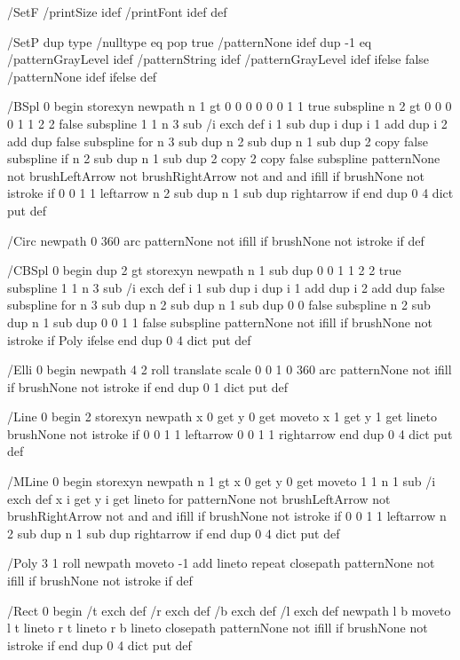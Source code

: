/SetF {
/printSize idef
/printFont idef
} def

/SetP {
dup type /nulltype eq {
pop true /patternNone idef
} {
dup -1 eq {
/patternGrayLevel idef
/patternString idef
} {
/patternGrayLevel idef
} ifelse
false /patternNone idef
} ifelse
} def

/BSpl {
0 begin
storexyn
newpath
n 1 gt {
0 0 0 0 0 0 1 1 true subspline
n 2 gt {
0 0 0 0 1 1 2 2 false subspline
1 1 n 3 sub {
/i exch def
i 1 sub dup i dup i 1 add dup i 2 add dup false subspline
} for
n 3 sub dup n 2 sub dup n 1 sub dup 2 copy false subspline
} if
n 2 sub dup n 1 sub dup 2 copy 2 copy false subspline
patternNone not brushLeftArrow not brushRightArrow not and and { ifill } if
brushNone not { istroke } if
0 0 1 1 leftarrow
n 2 sub dup n 1 sub dup rightarrow
} if
end
} dup 0 4 dict put def

/Circ {
newpath
0 360 arc
patternNone not { ifill } if
brushNone not { istroke } if
} def

/CBSpl {
0 begin
dup 2 gt {
storexyn
newpath
n 1 sub dup 0 0 1 1 2 2 true subspline
1 1 n 3 sub {
/i exch def
i 1 sub dup i dup i 1 add dup i 2 add dup false subspline
} for
n 3 sub dup n 2 sub dup n 1 sub dup 0 0 false subspline
n 2 sub dup n 1 sub dup 0 0 1 1 false subspline
patternNone not { ifill } if
brushNone not { istroke } if
} {
Poly
} ifelse
end
} dup 0 4 dict put def

/Elli {
0 begin
newpath
4 2 roll
translate
scale
0 0 1 0 360 arc
patternNone not { ifill } if
brushNone not { istroke } if
end
} dup 0 1 dict put def

/Line {
0 begin
2 storexyn
newpath
x 0 get y 0 get moveto
x 1 get y 1 get lineto
brushNone not { istroke } if
0 0 1 1 leftarrow
0 0 1 1 rightarrow
end
} dup 0 4 dict put def

/MLine {
0 begin
storexyn
newpath
n 1 gt {
x 0 get y 0 get moveto
1 1 n 1 sub {
/i exch def
x i get y i get lineto
} for
patternNone not brushLeftArrow not brushRightArrow not and and { ifill } if
brushNone not { istroke } if
0 0 1 1 leftarrow
n 2 sub dup n 1 sub dup rightarrow
} if
end
} dup 0 4 dict put def

/Poly {
3 1 roll
newpath
moveto
-1 add
{ lineto } repeat
closepath
patternNone not { ifill } if
brushNone not { istroke } if
} def

/Rect {
0 begin
/t exch def
/r exch def
/b exch def
/l exch def
newpath
l b moveto
l t lineto
r t lineto
r b lineto
closepath
patternNone not { ifill } if
brushNone not { istroke } if
end
} dup 0 4 dict put def

